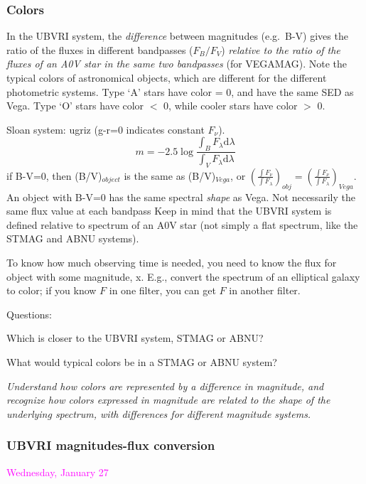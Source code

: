 \documentclass[12pt]{article}
\begin{document}
\subsubsection*{Colors}
In the UBVRI system, the \emph{difference} between magnitudes
(e.g.\ B-V) gives the ratio of the fluxes in different bandpasses
($F_{B}/F_{V}$)
\emph{relative to the ratio of the fluxes of
an A0V star in the same two bandpasses} (for VEGAMAG).
Note the typical colors of astronomical objects,
which are different for the different photometric systems.
Type `A' stars have color =  0, and have the same SED as Vega.
Type `O' stars have color $<$ 0,
while cooler stars have color $>$ 0.

Sloan system: ugriz (g-r=0 indicates constant $F_{\nu}$).
$$    m = -2.5\log\frac{\int_B F_{\lambda}\textrm{d}\lambda}
    {\int_V F_{\lambda}\textrm{d}\lambda} $$
if B-V=0, then (B/V)$_{object}$ is the same as (B/V)$_{Vega}$,
or $\left(\frac{\int F_{\nu}}{\int F_{\lambda}}\right)_{obj} =
    \left(\frac{\int F_{\nu}}{\int F_{\lambda}}\right)_{Vega} $.
An object with B-V=0 has the same spectral \emph{shape} as Vega.
Not necessarily the same flux value at each bandpass
Keep in mind that the UBVRI system is defined relative to spectrum of
an A0V star (not simply a flat spectrum, like the STMAG and ABNU
systems).

To know how much observing time is needed, you need to know the flux
for object with some magnitude, x.
E.g., convert the spectrum of an elliptical galaxy to color;
if you know $F$ in one filter, you can get $F$ in another filter.

Questions:
\begin{itemize*}
    \item Which is closer to the UBVRI system, STMAG or ABNU?
    \item What would typical colors be in a STMAG or ABNU system?
\end{itemize*}

\textcolor{om}{\emph{Understand how colors are represented by a difference in
magnitude, and recognize how colors expressed in magnitude are related
to the shape of the underlying spectrum, with differences for
different magnitude systems.}}

\subsubsection*{UBVRI magnitudes-flux conversion}
\textcolor{magenta}{Wednesday, January 27}
\end{document}
